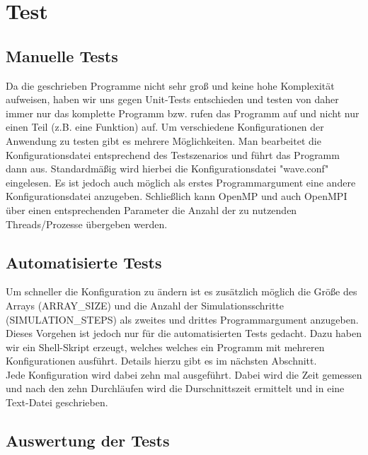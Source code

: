 
\section{Test}

\subsection{Manuelle Tests}
Da die geschrieben Programme nicht sehr groß und keine hohe Komplexität aufweisen, haben wir uns gegen Unit-Tests entschieden und testen von daher immer nur das komplette Programm bzw. rufen das Programm auf und nicht nur einen Teil (z.B. eine Funktion) auf.
Um verschiedene Konfigurationen der Anwendung zu testen gibt es mehrere Möglichkeiten. Man bearbeitet die Konfigurationsdatei entsprechend des Testszenarios und führt das Programm dann aus. Standardmäßig wird hierbei die Konfigurationsdatei "wave.conf" eingelesen. Es ist jedoch auch möglich als erstes Programmargument eine andere Konfigurationsdatei anzugeben. Schließlich kann OpenMP und auch OpenMPI über einen entsprechenden Parameter die Anzahl der zu nutzenden Threads/Prozesse übergeben werden.\\

\subsection{Automatisierte Tests}
Um schneller die Konfiguration zu ändern ist es zusätzlich möglich die Größe des Arrays (ARRAY\_SIZE) und die Anzahl der Simulationsschritte (SIMULATION\_STEPS) als zweites und drittes Programmargument anzugeben. Dieses Vorgehen ist jedoch nur für die automatisierten Tests gedacht. Dazu haben wir ein Shell-Skript erzeugt, welches welches ein Programm mit mehreren Konfigurationen ausführt. Details hierzu gibt es im nächsten Abschnitt.\\
Jede Konfiguration wird dabei zehn mal ausgeführt. Dabei wird die Zeit gemessen und nach den zehn Durchläufen wird die Durschnittszeit ermittelt und in eine Text-Datei geschrieben.

\subsection{Auswertung der Tests} %

